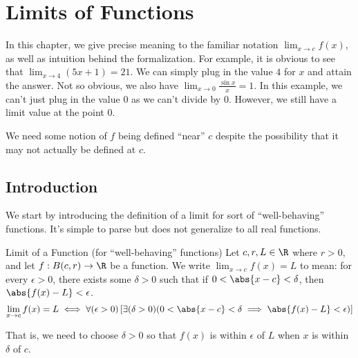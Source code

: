 \chapter{Limits of Functions}

In this chapter, we give precise meaning to the familiar notation $\lim_{x \to c} f(x)$, as well as intuition behind the formalization. For example, it is obvious to see that $\lim_{x \to 4} (5x+1) = 21$. We can simply plug in the value $4$ for $x$ and attain the answer. Not so obvious, we also have $\lim_{x \to 0} \frac{\sin x}{x} = 1$. In this example, we can't just plug in the value $0$ as we can't divide by $0$. However, we still have a limit value at the point $0$.

We need some notion of $f$ being defined ``near'' $c$ despite the possibility that it may not actually be defined at $c$.

\section{Introduction}

We start by introducing the definition of a limit for sort of ``well-behaving'' functions. It's simple to parse but does not generalize to all real functions.

\begin{dfnbox}{Limit of a Function (for ``well-behaving'' functions)}{}
    Let $c, r, L \in \R$ where $r > 0$, and let $f : B(c, r) \to \R$ be a function. We write $\lim_{x \to c} f(x) = L$ to mean: for every $\epsilon > 0$, there exists some $\delta > 0$ such that if $0 < \abs{x-c} < \delta$, then $\abs{f(x) - L} < \epsilon$.
    \tcblower
    \[ \lim_{x \to c} f(x) = L \iff \forall(\epsilon > 0) \left[ \exists (\delta > 0) (0 < \abs{x-c} < \delta \implies \abs{f(x) - L} < \epsilon) \right] \]
\end{dfnbox}

That is, we need to choose $\delta > 0$ so that $f(x)$ is within $\epsilon$ of $L$ when $x$ is within $\delta$ of $c$.

